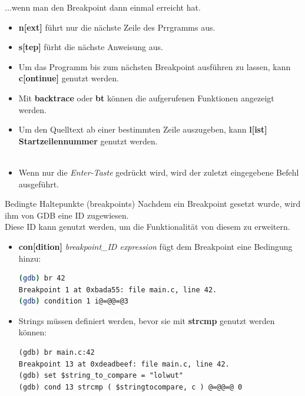 \begin{frame}{...wenn man den Breakpoint dann einmal erreicht hat.}
	\begin{itemize}
		\item \textbf{n[ext]} f\"uhrt nur die n\"achste Zeile des Prrgramms aus.
		\item \textbf{s[tep]} f\"urht die n\"achste Anweisung aus.
		\item Um das Programm bis zum n\"achsten Breakpoint ausf\"uhren zu lassen, kann \textbf{c[ontinue]} genutzt werden.
		\item Mit \textbf{backtrace} oder \textbf{bt} k\"onnen die aufgerufenen Funktionen angezeigt werden.\\
		\item Um den Quelltext ab einer bestimmten Zeile auszugeben, kann \textbf{l[ist] Startzeilennummer} genutzt werden.
		\\\ \\
		\item Wenn nur die \textit{Enter-Taste} gedr\"uckt wird, wird der zuletzt eingegebene Befehl ausgef\"uhrt.
	\end{itemize}
\end{frame}


\begin{frame}[fragile]{Bedingte Haltepunkte (breakpoints)}
Nachdem ein Breakpoint gesetzt wurde, wird ihm von GDB eine ID zugewiesen.\\
Diese ID kann genutzt werden, um die Funktionalit\"at von diesem zu erweitern.
	\begin{itemize}
		\item \textbf{con[dition]} \textit{breakpoint\_ID expression} f\"ugt dem Breakpoint eine Bedingung hinzu:
		\begin{lstlisting}[numbers=none,language=bash]
(gdb) br 42
Breakpoint 1 at 0xbada55: file main.c, line 42.
(gdb) condition 1 i@=@@=@3
\end{lstlisting}
		\item Strings m\"ussen definiert werden, bevor sie mit \textbf{strcmp} genutzt werden k\"onnen:
		\begin{lstlisting}
(gdb) br main.c:42
Breakpoint 13 at 0xdeadbeef: file main.c, line 42.
(gdb) set $string_to_compare = "lolwut"
(gdb) cond 13 strcmp ( $stringtocompare, c ) @=@@=@ 0
\end{lstlisting}
	\end{itemize}
\end{frame}

